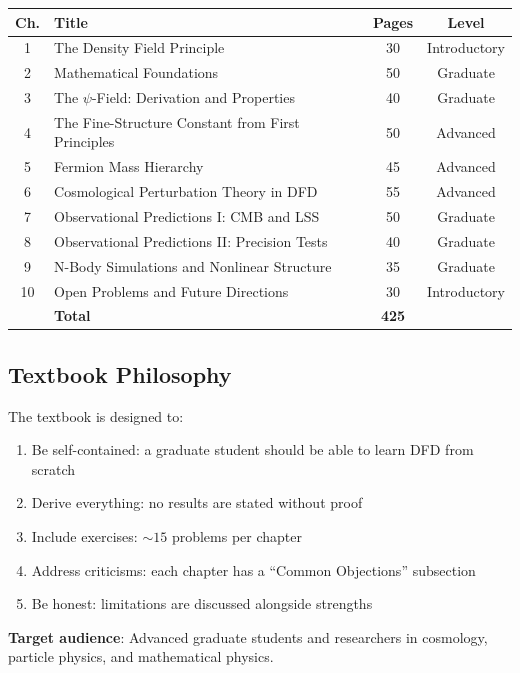 \documentclass[11pt,a4paper]{article}
\begin{document}
\begin{center}
\begin{tabular}{clcc}
\toprule
\textbf{Ch.} & \textbf{Title} & \textbf{Pages} & \textbf{Level} \\
\midrule
1 & The Density Field Principle & 30 & Introductory \\
2 & Mathematical Foundations & 50 & Graduate \\
3 & The $\psi$-Field: Derivation and Properties & 40 & Graduate \\
4 & The Fine-Structure Constant from First Principles & 50 & Advanced \\
5 & Fermion Mass Hierarchy & 45 & Advanced \\
6 & Cosmological Perturbation Theory in DFD & 55 & Advanced \\
7 & Observational Predictions I: CMB and LSS & 50 & Graduate \\
8 & Observational Predictions II: Precision Tests & 40 & Graduate \\
9 & N-Body Simulations and Nonlinear Structure & 35 & Graduate \\
10 & Open Problems and Future Directions & 30 & Introductory \\
\midrule
& \textbf{Total} & \textbf{425} & \\
\bottomrule
\end{tabular}
\end{center}

\subsection{Textbook Philosophy}

The textbook is designed to:
\begin{enumerate}[nosep]
\item Be self-contained: a graduate student should be able to learn DFD from scratch
\item Derive everything: no results are stated without proof
\item Include exercises: $\sim 15$ problems per chapter
\item Address criticisms: each chapter has a ``Common Objections'' subsection
\item Be honest: limitations are discussed alongside strengths
\end{enumerate}

\textbf{Target audience}: Advanced graduate students and researchers in cosmology, particle physics, and mathematical physics.
\end{document}
